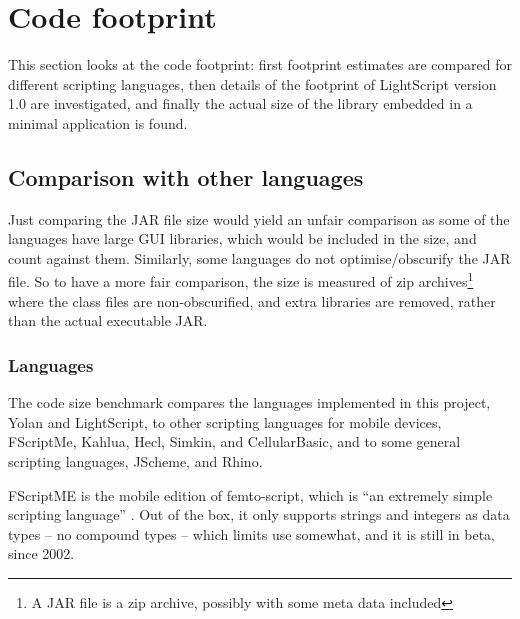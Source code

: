 \documentclass[11pt]{report}
\begin{document}
\section{Code footprint}
This section looks at the code footprint: first footprint estimates are compared for different scripting languages, then details of the footprint of LightScript version 1.0 are investigated, and finally the actual size of the library embedded in a minimal application is found.

\subsection{Comparison with other languages}
Just comparing the JAR file size would yield an unfair comparison as some of the languages have large GUI libraries, which would be included in the size, and count against them.
Similarly, some languages do not optimise/obscurify the JAR file.
So to have a more fair comparison, the size is measured of zip archives\footnote{A JAR file is a zip archive, possibly with some meta data included} where the class files are non-obscurified, and extra libraries are removed, rather than the actual executable JAR.



\subsubsection{Languages}
\label{codefootprint-languages}
The code size benchmark compares the languages implemented in this project, Yolan and LightScript, to other scripting languages for mobile devices, FScriptMe, Kahlua, Hecl, Simkin, and CellularBasic, and to some general scripting languages,  JScheme, and Rhino.

FScriptME \cite{fscriptme} is the mobile edition of femto-script, which is ``an extremely simple scripting language'' \cite{fscript}. 
Out of the box, it only supports strings and integers as data types -- no compound types -- which limits use somewhat, and it is still in beta, since 2002. 
\end{document}

